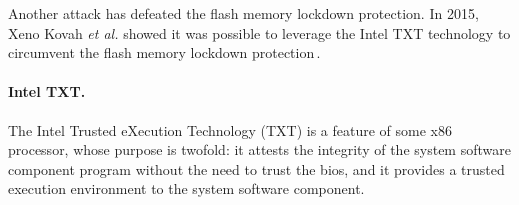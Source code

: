 Another attack has defeated the flash memory lockdown protection.
%
In 2015, Xeno Kovah \emph{et al.} showed it was possible to leverage the Intel
TXT technology to circumvent the flash memory lockdown
protection\,\cite{kovah2015senter}.

\paragraph{Intel TXT.}
%
The Intel Trusted eXecution Technology (TXT)\cite{intel2015txt} is a feature of
some x86 processor, whose purpose is twofold: it attests the integrity of the
system software component program without the need to trust the \ac{bios}, and
it provides a trusted execution environment to the system software component.
%
%

